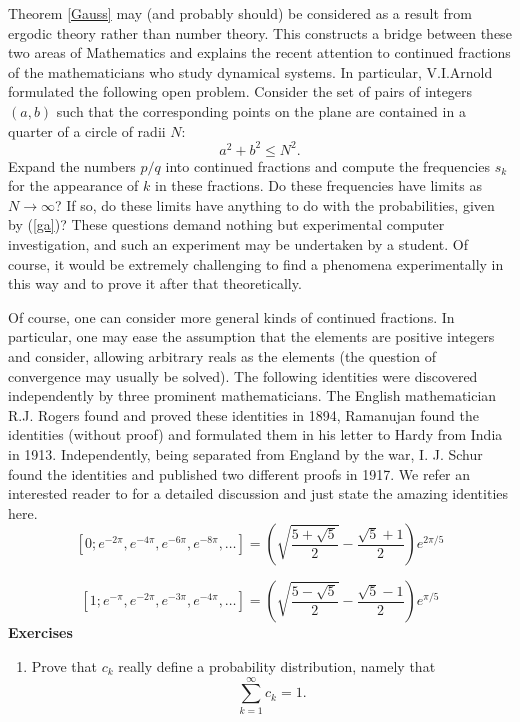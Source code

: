 \documentclass[12pt,letterpaper]{book}
\begin{document}
Theorem \ref{Gauss} may (and probably should) be considered as a
result from ergodic theory rather than number theory. This
constructs a bridge between these two areas of Mathematics and
explains the recent attention to continued fractions of the
mathematicians who study dynamical systems. In particular,
V.I.Arnold formulated the following open problem.
Consider the set of pairs of integers $(a,b)$ such
that the corresponding points on the plane are contained in a
quarter of a circle of radii $N$:
$$
a^2 + b^2 \leq N^2.
$$
Expand the numbers $p/q$ into continued fractions and compute the
frequencies $s_k$ for the appearance of $k$ in these fractions. Do
these frequencies have limits as $N \rightarrow \infty$? If so, do
these limits have anything to do with the probabilities, given by
(\ref{ga})? These questions demand nothing but experimental computer
investigation, and such an experiment may be undertaken by a
student. Of course, it would be extremely challenging to find a
phenomena experimentally in this way and to prove it after that
theoretically. \par Of course, one can consider more general kinds
of continued fractions. In particular, one may ease the assumption
that the elements are positive integers and consider, allowing
arbitrary reals as the elements (the question of convergence may
usually be solved). The following identities were discovered
independently by three prominent mathematicians. The English
mathematician R.J. Rogers found and proved these identities in 1894,
Ramanujan found the identities (without proof) and formulated them
in his letter to Hardy from India in 1913. Independently, being
separated from England by the war, I. J. Schur found the identities
and published two different proofs in 1917. We refer an interested
reader to \cite{Andrews} for a detailed discussion and just state
the amazing identities here.
$$
[0;e^{-2\pi},e^{-4\pi},e^{-6\pi},e^{-8\pi}, \ldots ]=
\left(\sqrt{\frac{5+\sqrt{5}}{2}} - \frac{\sqrt{5}+1}{2} \right)
e^{2\pi/5}
$$

$$
[1;e^{-\pi},e^{-2\pi},e^{-3\pi},e^{-4\pi}, \ldots ]=
\left(\sqrt{\frac{5-\sqrt{5}}{2}} - \frac{\sqrt{5}-1}{2} \right)
e^{\pi/5}
$$
\textbf{Exercises}
\begin{enumerate}
\item{Prove that $c_k$ really define a probability distribution,
namely that
$$
\sum_{k=1}^\infty c_k =1.
$$
}
\end{enumerate}
\end{document}
